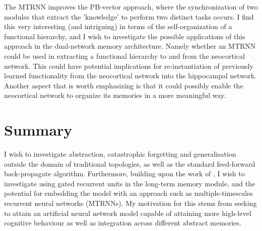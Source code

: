 The MTRNN improves the PB-vector approach, where the synchronization of two modules that extract the 'knowledge' to perform two distinct tasks occurs. I find this very interesting (and intriguing) in terms of the self-organization of a functional hierarchy, and I wish to investigate the possible applications of this approach in the dual-network memory architecture. Namely whether an MTRNN could be used in extracting a functional hierarchy to and from the neocortical network. This could have potential implications for re-instantiation of previously learned functionality from the neocortical network into the hippocampal network. Another aspect that is worth emphasizing is that it could possibly enable the neocortical network to organize its memories in a more meaningful way.

\section{Summary}

I wish to investigate abstraction, catastrophic forgetting and generalisation outside the domain of traditional topologies, as well as the standard feed-forward back-propagate algorithm. Furthermore, building upon the work of \cite{Hattori2014}, I wish to investigate using gated recurrent units \citep{Cho2014} in the long-term memory module, and the potential for embedding the model with an approach such as multiple-timescales recurrent neural networks (MTRNNs). My motivation for this stems from seeking to attain an artificial neural network model capable of attaining more high-level cognitive behaviour as well as integration across different abstract memories.


\cleardoublepage